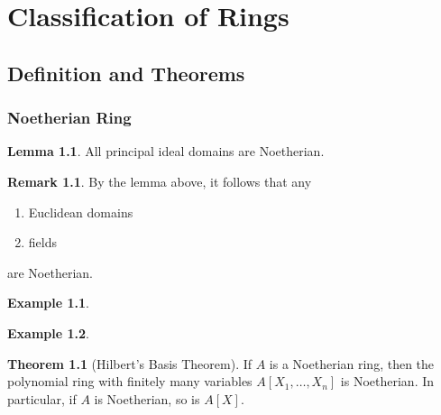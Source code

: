 \documentclass[a4paper]{book}
\theoremstyle{definition}
\newtheorem{example}{Example}[definition]
\newtheorem{theorem}[definition]{Theorem}
\newtheorem{lemma}[definition]{Lemma}
\newtheorem*{remark}{Remark}
\begin{document}







\chapter{Classification of Rings}
\section{Definition and Theorems}
\subsection{Noetherian Ring}

\begin{thmbox}
    \begin{lemma}
        All principal ideal domains are Noetherian.
    \end{lemma}
\end{thmbox}

\begin{rembox}
    \begin{remark}
        By the lemma above, it follows that any
        \begin{enumerate}
            \item Euclidean domains
            \item fields
        \end{enumerate}
        are Noetherian.
    \end{remark}
\end{rembox}

\begin{example}
    
\end{example}

\begin{example}
    
\end{example}

\begin{thmbox}
    \begin{theorem}[Hilbert's Basis Theorem]
        If \(A\) is a Noetherian ring, then the polynomial ring with finitely many variables \(A[X_1, \ldots, X_n]\) is Noetherian. In particular, if \(A\) is Noetherian, so is \(A[X]\).
    \end{theorem}
\end{thmbox}
\end{document}

